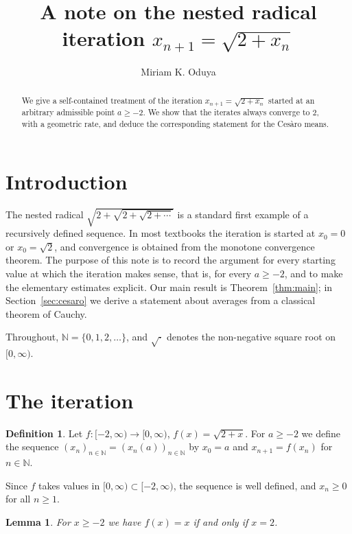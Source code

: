 \documentclass[11pt]{amsart}
\title{A note on the nested radical iteration $x_{n+1}=\sqrt{2+x_n}$}
\author{Miriam K. Oduya}
\date{}
\newtheorem{lemma}[theorem]{Lemma}
\theoremstyle{definition}
\newtheorem{definition}[theorem]{Definition}
\begin{document}
\begin{abstract}
We give a self-contained treatment of the iteration $x_{n+1}=\sqrt{2+x_n}$
started at an arbitrary admissible point $a\ge -2$. We show that the iterates
always converge to $2$, with a geometric rate, and deduce the corresponding
statement for the Ces\`aro means.
\end{abstract}

\maketitle

\section{Introduction}

The nested radical $\sqrt{2+\sqrt{2+\sqrt{2+\cdots}}}$ is a standard first
example of a recursively defined sequence. In most textbooks the iteration is
started at $x_0=0$ or $x_0=\sqrt 2$, and convergence is obtained from the
monotone convergence theorem. The purpose of this note is to record the
argument for every starting value at which the iteration makes sense, that
is, for every $a\ge -2$, and to make the elementary estimates explicit.
Our main result is Theorem~\ref{thm:main}; in Section~\ref{sec:cesaro} we
derive a statement about averages from a classical theorem of Cauchy.

Throughout, $\mathbb N=\{0,1,2,\dots\}$, and $\sqrt{\cdot}$ denotes the
non-negative square root on $[0,\infty)$.

\section{The iteration}

\begin{definition}\label{def:seq}
Let $f\colon[-2,\infty)\to[0,\infty)$, $f(x)=\sqrt{2+x}$. For $a\ge -2$ we
define the sequence $(x_n)_{n\in\mathbb N}=(x_n(a))_{n\in\mathbb N}$ by
$x_0=a$ and $x_{n+1}=f(x_n)$ for $n\in\mathbb N$.
\end{definition}

Since $f$ takes values in $[0,\infty)\subset[-2,\infty)$, the sequence is
well defined, and $x_n\ge 0$ for all $n\ge 1$.

\begin{lemma}\label{lem:fixed}
For $x\ge -2$ we have $f(x)=x$ if and only if $x=2$.
\end{lemma}
\end{document}
